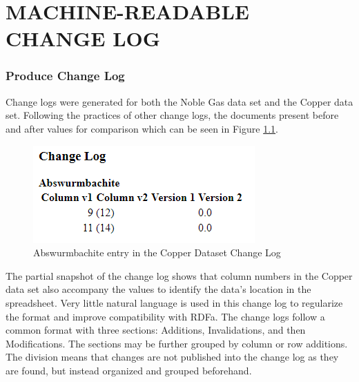 
\chapter{MACHINE-READABLE CHANGE LOG}\label{ch:changelog}

\subsection{Produce Change Log}

Change logs were generated for both the Noble Gas data set and the Copper data set.
Following the practices of other change logs, the documents present before and after values for comparison which can be seen in Figure \ref{changelog_zoomed}.
\begin{figure}
	\centering
	\includegraphics[scale=0.80]{figures/Changelog-zoomed.png}
	\caption{Abswurmbachite entry in the Copper Dataset Change Log}
	\label{changelog_zoomed}
\end{figure}
The partial snapshot of the change log shows that column numbers in the Copper data set also accompany the values to identify the data's location in the spreadsheet.
Very little natural language is used in this change log to regularize the format and improve compatibility with RDFa.
The change logs follow a common format with three sections: Additions, Invalidations, and then Modifications.
The sections may be further grouped by column or row additions.
The division means that changes are not published into the change log as they are found, but instead organized and grouped beforehand.

